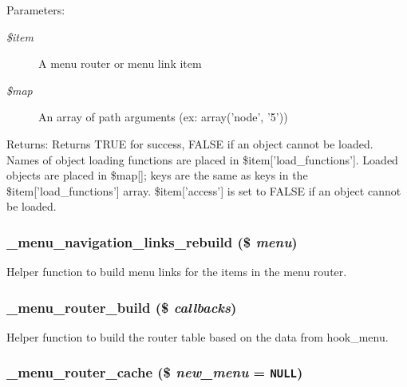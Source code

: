 \begin{Desc}
\item[Parameters:]
\begin{description}
\item[{\em \$item}]A menu router or menu link item \item[{\em \$map}]An array of path arguments (ex: array('node', '5')) \end{description}
\end{Desc}
\begin{Desc}
\item[Returns:]Returns TRUE for success, FALSE if an object cannot be loaded. Names of object loading functions are placed in \$item\mbox{[}'load\_\-functions'\mbox{]}. Loaded objects are placed in \$map\mbox{[}\mbox{]}; keys are the same as keys in the \$item\mbox{[}'load\_\-functions'\mbox{]} array. \$item\mbox{[}'access'\mbox{]} is set to FALSE if an object cannot be loaded. \end{Desc}
\hypertarget{group__menu_g69fdf86c20d033bc7ba46a14937e20ea}{
\subsubsection[{\_\-menu\_\-navigation\_\-links\_\-rebuild}]{\setlength{\rightskip}{0pt plus 5cm}\_\-menu\_\-navigation\_\-links\_\-rebuild (\$ {\em menu})}}
\label{group__menu_g69fdf86c20d033bc7ba46a14937e20ea}


Helper function to build menu links for the items in the menu router. \hypertarget{group__menu_g662b13ca71a8b780c9a3b372b25492c3}{
\subsubsection[{\_\-menu\_\-router\_\-build}]{\setlength{\rightskip}{0pt plus 5cm}\_\-menu\_\-router\_\-build (\$ {\em callbacks})}}
\label{group__menu_g662b13ca71a8b780c9a3b372b25492c3}


Helper function to build the router table based on the data from hook\_\-menu. \hypertarget{group__menu_g02af3d3800722e9ff5be36485b655905}{
\subsubsection[{\_\-menu\_\-router\_\-cache}]{\setlength{\rightskip}{0pt plus 5cm}\_\-menu\_\-router\_\-cache (\$ {\em new\_\-menu} = {\tt NULL})}}
\label{group__menu_g02af3d3800722e9ff5be36485b655905}


